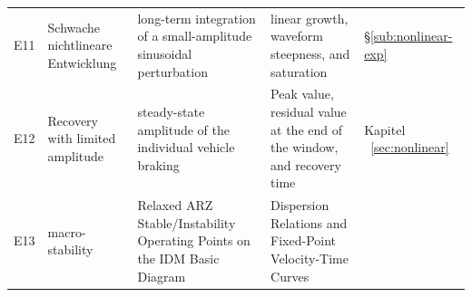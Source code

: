 \documentclass[11pt,a4paper,openany]{book}
\numberwithin{equation}{chapter}
\numberwithin{figure}{chapter}
\numberwithin{table}{chapter}
\begin{document}
\begin{center}
\begin{tabular}{p{0.85cm}p{2.3cm}p{3.5cm}p{4.2cm}p{2.7cm}}
\\
E11 &




 Schwache nichtlineare Entwicklung




&






long-term integration of a small-amplitude sinusoidal perturbation






&






linear growth, waveform steepness, and saturation






& \S\ref{sub:nonlinear-exp} \\
E12 &






Recovery with limited amplitude






&






steady-state amplitude of the individual vehicle braking






&






Peak value, residual value at the end of the window, and recovery time






&




Kapitel ~\ref{sec:nonlinear}~



\\
E13 &






macro-stability

& Relaxed ARZ Stable/Instability Operating Points on the IDM Basic Diagram




&




 Dispersion Relations and Fixed-Point Velocity-Time Curves





\end{tabular}
\end{center}
\end{document}
